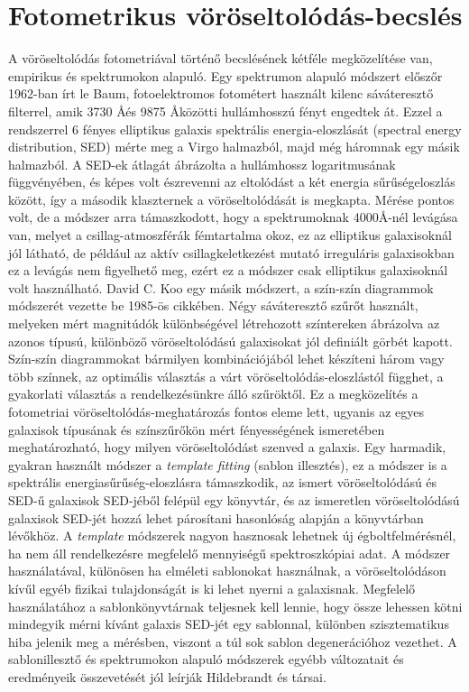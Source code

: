 \documentclass[12pt,letterpaper,twoside,openright]{book}
\begin{document}
\section{Fotometrikus vöröseltolódás-becslés}
A vöröseltolódás fotometriával történő becslésének kétféle megközelítése van, empirikus és spektrumokon alapuló. Egy  spektrumon alapuló módszert előszőr 1962-ban írt le  Baum\cite{baum}, fotoelektromos fotométert használt kilenc sáváteresztő filterrel, amik  3730 \AA  \text{ }és 9875 \AA \text{ }közötti hullámhosszú fényt engedtek át. Ezzel a rendszerrel 6 fényes elliptikus galaxis spektrális energia-eloszlását (spectral energy distribution, SED) mérte meg a Virgo halmazból, majd még háromnak egy másik halmazból. A SED-ek átlagát ábrázolta a hullámhossz logaritmusának függvényében, és képes volt észrevenni az eltolódást a két energia sűrűségeloszlás  között, így a második klaszternek a vöröseltolódását is megkapta. Mérése pontos volt, de a módszer arra támaszkodott, hogy a  spektrumoknak 4000\text{ }\AA -nél levágása van, melyet a csillag-atmoszférák fémtartalma okoz, ez az elliptikus galaxisoknál jól látható, de például az  aktív csillagkeletkezést mutató irreguláris galaxisokban ez a levágás nem figyelhető meg, ezért ez a módszer csak elliptikus galaxisoknál volt használható\cite{webp}.
\newline \indent
David C. Koo egy másik módszert, a szín-szín diagrammok módszerét vezette be 1985-ös cikkében\cite{Koo}. Négy sáváteresztő szűrőt használt, melyeken mért magnitúdók különbségével létrehozott színtereken ábrázolva az azonos típusú, különböző vöröseltolódású galaxisokat jól definiált görbét kapott. Szín-szín diagrammokat bármilyen kombinációjából lehet készíteni három vagy több színnek, az optimális választás a várt vöröseltolódás-eloszlástól függhet, a gyakorlati választás a rendelkezésünkre álló szűröktől\cite{Koo}. Ez a megközelítés  a fotometriai vöröseltolódás-meghatározás fontos eleme lett, ugyanis az egyes galaxisok típusának és színszűrőkön mért fényességének ismeretében meghatározható, hogy milyen vöröseltolódást szenved a galaxis.
\newline \indent
 Egy harmadik, gyakran használt módszer a \textit{template fitting} (sablon illesztés), ez a módszer is a spektrális energiasűrűség-eloszlásra támaszkodik, az ismert vöröseltolódású és SED-ű galaxisok SED-jéből felépül egy könyvtár, és az ismeretlen vöröseltolódású galaxisok SED-jét hozzá lehet párosítani hasonlóság alapján a könyvtárban lévőkhöz. A \textit{template} módszerek nagyon hasznosak lehetnek új égboltfelmérésnél, ha nem áll rendelkezésre megfelelő mennyiségű spektroszkópiai adat. A módszer használatával, különösen ha elméleti sablonokat használnak\cite{bruzual}, a vöröseltolódáson kívűl egyéb fizikai tulajdonságát is ki lehet nyerni a galaxisnak. Megfelelő használatához a sablonkönyvtárnak teljesnek kell lennie, hogy össze lehessen kötni mindegyik mérni kívánt galaxis SED-jét egy sablonnal, különben szisztematikus hiba jelenik meg a mérésben, viszont a túl sok sablon degenerációhoz vezethet. A sablonillesztő és spektrumokon alapuló módszerek egyébb változatait és eredményeik összevetését jól leírják Hildebrandt és társai\cite{hild}.
\end{document}
